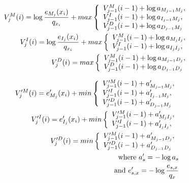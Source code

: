 \documentclass[preprint,nonatbib,blockstyle,nocopyrightspace,times]{sigplanconf}
\begin{document}
\begin{eqnarray}    
V_{j}^{M}(i) = \log\frac{e_{M_{j}}(x_{i})}{q_{x_{i}}} + max \left\{
\begin{array}{l l}
V_{j-1}^{M}(i - 1) + \log a_{M_{j-1}M_{j}},\\
V_{j-1}^{I}(i - 1) + \log a_{I_{j-1}M_{j}},\\
V_{j-1}^{D}(i - 1) + \log a_{D_{j-1}M_{j}}\\
\end{array} \right.\nonumber\\
V_{j}^{I}(i) = \log\frac{e_{I_{j}}(x_{i})}{q_{x_{i}}} + max \left\{
\begin{array}{l l}
V_{j-1}^{M}(i - 1) + \log a_{M_{j}I_{j}},\\
V_{j-1}^{I}(i - 1) + \log a_{I_{j}I_{j}},\\
\end{array} \right.\nonumber\\
V_{j}^{D}(i) = max \left\{
\begin{array}{l l}
V_{j-1}^{M}(i - 1) + \log a_{M_{j-1}D_{j}},\\
V_{j-1}^{D}(i - 1) + \log a_{D_{j-1}D_{j}}\\
\end{array} \right.\nonumber\\
\end{eqnarray}\label{viterbi_eqn}

\begin{eqnarray}    
V_{j}^{\prime M}(i) = e^{\prime}_{M_{j}}(x_{i}) + min \left\{
\begin{array}{l l}
V_{j-1}^{\prime M}(i - 1) + a^{\prime}_{M_{j-1}M_{j}},\\
V_{j-1}^{\prime I}(i - 1) + a^{\prime}_{I_{j-1}M_{j}},\\
V_{j-1}^{\prime D}(i - 1) + a^{\prime}_{D_{j-1}M_{j}}\\
\end{array} \right.\nonumber\\
V_{j}^{\prime I}(i) = e^{\prime}_{I_{j}}(x_{i}) + min \left\{
\begin{array}{l l}
V_{j-1}^{\prime M}(i - 1) + a^{\prime}_{M_{j}I_{j}},\\
V_{j-1}^{\prime I}(i - 1) + a^{\prime}_{I_{j}I_{j}},\\
\end{array} \right.\nonumber\\
V_{j}^{\prime D}(i) = min \left\{
\begin{array}{l l}
V_{j-1}^{\prime M}(i - 1) + a^{\prime}_{M_{j-1}D_{j}},\\
V_{j-1}^{\prime D}(i - 1) + a^{\prime}_{D_{j-1}D_{j}}\\
\end{array} \right.\nonumber\\
\text{where } a^{\prime}_{s} = - \log a_{s} \nonumber \\
\text{and } e^{\prime}_{s,x} = - \log\frac{e_{s,x}}{q_{x}} \nonumber
\end{eqnarray}\label{viterbi_log_eqn}
\end{document}
